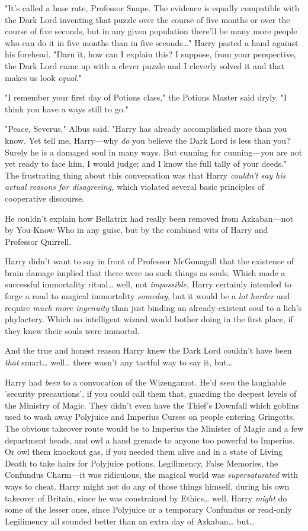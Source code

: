 "It's called a base rate, Professor Snape. The evidence is equally compatible with the Dark Lord inventing that puzzle over the course of five months or over the course of five seconds, but in any given population there'll be many more people who can do it in five months than in five seconds{\ldots}" Harry pasted a hand against his forehead. "Darn it, how can I explain this? I suppose, from your perspective, the Dark Lord came up with a clever puzzle and I cleverly solved it and that makes us look \emph{equal}."

"I remember your first day of Potions class," the Potions Master said dryly. "I think you have a ways still to go."

"Peace, Severus," Albus said. "Harry has already accomplished more than you know. Yet tell me, Harry---why \emph{do} you believe the Dark Lord is less than you? Surely he is a damaged soul in many ways. But cunning for cunning---you are not yet ready to face him, I would judge; and I know the full tally of your deeds."
\sbreak
The frustrating thing about this conversation was that Harry \emph{couldn't say his actual reasons for disagreeing,} which violated several basic principles of cooperative discourse.

He couldn't explain how Bellatrix had really been removed from Azkaban---not by You-Know-Who in any guise, but by the combined wits of Harry and Professor Quirrell.

Harry didn't want to say in front of Professor McGonagall that the existence of brain damage implied that there were no such things as souls. Which made a successful immortality ritual{\ldots} well, not \emph{impossible,} Harry certainly intended to forge a road to magical immortality \emph{someday}, but it would be a \emph{lot harder} and require \emph{much more ingenuity} than just binding an already-existent soul to a lich's phylactery. Which no intelligent wizard would bother doing in the first place, if they knew their souls were immortal.

And the true and honest reason Harry knew the Dark Lord couldn't have been \emph{that} smart{\ldots} well{\ldots} there wasn't any tactful way to say it, but{\ldots}

Harry had \emph{been} to a convocation of the Wizengamot. He'd \emph{seen} the laughable 'security precautions', if you could call them that, guarding the deepest levels of the Ministry of Magic. They didn't even have the Thief's Downfall which goblins used to wash away Polyjuice and Imperius Curses on people entering Gringotts. The obvious takeover route would be to Imperius the Minister of Magic and a few department heads, and owl a hand grenade to anyone too powerful to Imperius. Or owl them knockout gas, if you needed them alive and in a state of Living Death to take hairs for Polyjuice potions. Legilimency, False Memories, the Confundus Charm---it was ridiculous, the magical world was \emph{supersaturated} with ways to cheat. Harry might not do any of those things himself, during his own takeover of Britain, since he was constrained by Ethics{\ldots} well, Harry \emph{might} do some of the lesser ones, since Polyjuice or a temporary Confundus or read-only Legilimency all sounded better than an extra day of Azkaban{\ldots} but{\ldots}

